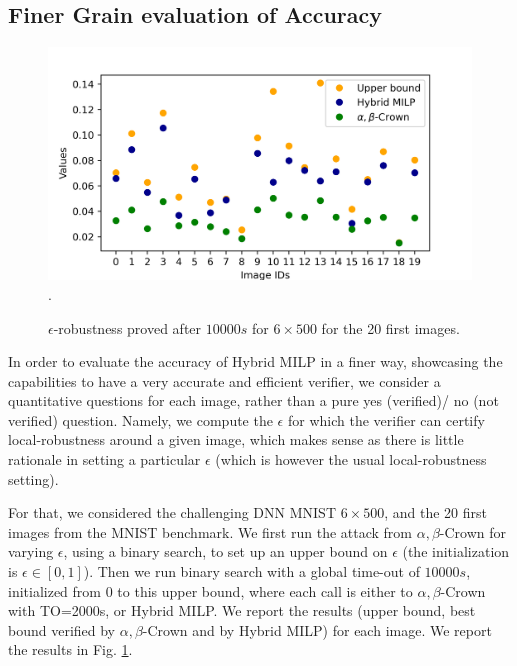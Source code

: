 \subsection{Finer Grain evaluation of Accuracy}

\begin{figure}[b!]
	\begin{centering}
\includegraphics[scale=0.6]{epsilon.png}.
\caption{$\epsilon$-robustness proved after $10 000s$ for $6 \times 500$ for the 20 first images.}
\label{fig2}
	\end{centering}
\end{figure}

In order to evaluate the accuracy of Hybrid MILP in a finer way, showcasing 
the capabilities to have a very accurate and efficient verifier, we consider
a quantitative questions for each image, rather than a pure yes (verified)/ no (not verified) question. Namely, we compute the $\epsilon$ for which the verifier can certify local-robustness around a given image, which makes sense as there is little rationale in setting a particular $\epsilon$ (which is however the usual local-robustness setting).

For that, we considered the challenging DNN MNIST $6 \times 500$, and the 20 first images from the MNIST benchmark. We first run the attack from $\alpha,\beta$-Crown for varying $\epsilon$, using a binary search, to set up an upper bound on $\epsilon$ (the initialization is $\epsilon \in [0,1]$).
Then we run binary search with a global time-out of $10 000s$, initialized from $0$ to this upper bound, where each call is either to $\alpha,\beta$-Crown with TO=2000s, or Hybrid MILP.
We report the results (upper bound, best bound verified by $\alpha,\beta$-Crown and by Hybrid MILP) for each image. We report the results in Fig. \ref{fig2}.



